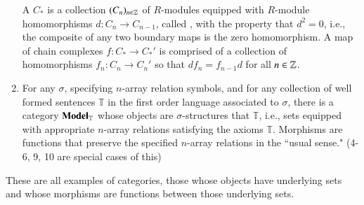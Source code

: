 \documentclass[12pt]{report}
\begin{document}
\begin{eg}{}{}
\begin{enumerate}
\begin{defn}{}{}
                A  $C_*$ is a collection $(C_n)_{n \in \mathbb Z}$ of $R$-modules equipped with $R$-module homomorphisms $d:C_n\rightarrow C_{n-1}$, called , with the property that $d^2 = 0$, i.e., the composite of any two boundary maps is the zero homomorphism. A map of chain complexes $f:C_* \rightarrow C_*'$ is comprised of a collection of homomorphisms $f_n:C_n\rightarrow C_n'$ so that $df_n = f_{n-1}d$ for all $n \in \mathbb Z$.
            \end{defn}
        \item For any  $\sigma$, specifying $n$-array relation symbols, and for any collection of well formed sentences $\mathbb{T}$ in the first order language associated to $\sigma$, there is a category $\normalfont\textbf{Model}_{\mathbb{T}}$ whose objects are $\sigma$-structures that  $\mathbb{T}$, i.e., sets equipped with appropriate $n$-array relations satisfying the axioms $\mathbb{T}$. Morphisms are functions that preserve the specified $n$-array relations in the ``usual sense." (4-6, 9, 10 are special cases of this)
    \end{enumerate}
\end{eg}

These are all examples of  categories, those whose objects have underlying sets and whose morphisms are functions between those underlying sets.
\end{document}
